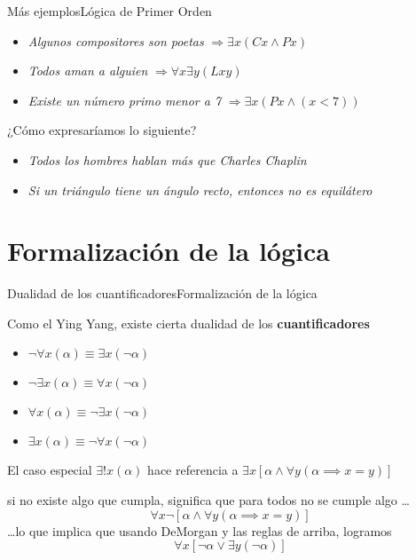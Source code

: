 \documentclass[spanish, c]{beamer}
\begin{document}
\begin{frame}{Más ejemplos}{Lógica de Primer Orden}
    \begin{itemize}[<+->]
        \item \textit{Algunos compositores son poetas} $\Rightarrow \exists x (Cx \wedge Px)$
        \item \textit{Todos aman a alguien} $\Rightarrow \forall x \exists y (Lxy)$
        \item \textit{Existe un número primo menor a 7} $\Rightarrow \exists x(Px \wedge (x < 7))$
    \end{itemize} \pause

    \bigskip

    ¿Cómo expresaríamos lo siguiente? \pause

    \bigskip
    
    \begin{itemize}
        \item \textit{Todos los hombres hablan más que Charles Chaplin} \pause
        \item \textit{Si un triángulo tiene un ángulo recto, entonces no es equilátero}
    \end{itemize}    
\end{frame}

\section{Formalización de la lógica}

\begin{frame}{Dualidad de los cuantificadores}{Formalización de la lógica}

    Como el Ying Yang, existe cierta \alert{dualidad} de los \textbf{cuantificadores} \pause
    \bigskip
    \begin{itemize}[<+->]
        \item $\neg \forall x(\alpha) \equiv \exists x(\neg \alpha)$
        \item $\neg \exists x(\alpha) \equiv \forall x(\neg \alpha)$
        \item $\forall x(\alpha) \equiv \neg \exists x(\neg \alpha)$
        \item $\exists x(\alpha) \equiv \neg \forall x(\neg \alpha)$
    \end{itemize} \pause

    El caso especial $\exists! x(\alpha)$ hace referencia a $\exists x[\alpha \wedge \forall y(\alpha \implies x=y)]$ \pause

    si no existe algo que cumpla, significa que para todos no se cumple algo \dots
    $$\forall x\neg[\alpha \wedge \forall y(\alpha \implies x=y)]$$ \pause
    \dots lo que implica que usando DeMorgan y las reglas de arriba, logramos
    $$\forall x [\neg \alpha \vee \exists y(\neg \alpha)]$$

\end{frame}
\end{document}

